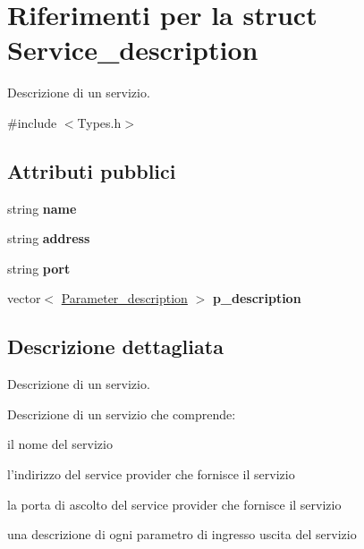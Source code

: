 \hypertarget{struct_service__description}{\section{Riferimenti per la struct Service\-\_\-description}
\label{struct_service__description}
}


Descrizione di un servizio.  




{\ttfamily \#include $<$Types.\-h$>$}

\subsection*{Attributi pubblici}
\begin{DoxyCompactItemize}
\item 
\hypertarget{struct_service__description_a6c61a7fe832b55eec7ec25db11cb6b5e}{string {\bfseries name}}\label{struct_service__description_a6c61a7fe832b55eec7ec25db11cb6b5e}

\item 
\hypertarget{struct_service__description_a20264f028c7feb764b4a010417422c81}{string {\bfseries address}}\label{struct_service__description_a20264f028c7feb764b4a010417422c81}

\item 
\hypertarget{struct_service__description_ad8c75edbd6d33704a05037774967cd96}{string {\bfseries port}}\label{struct_service__description_ad8c75edbd6d33704a05037774967cd96}

\item 
\hypertarget{struct_service__description_a0fdb676f354630feb1fc0535fff3a24d}{vector$<$ \hyperlink{struct_parameter__description}{Parameter\-\_\-description} $>$ {\bfseries p\-\_\-description}}\label{struct_service__description_a0fdb676f354630feb1fc0535fff3a24d}

\end{DoxyCompactItemize}


\subsection{Descrizione dettagliata}
Descrizione di un servizio. 

Descrizione di un servizio che comprende\-: \begin{DoxyItemize}
\item il nome del servizio \item l'indirizzo del service provider che fornisce il servizio \item la porta di ascolto del service provider che fornisce il servizio \item una descrizione di ogni parametro di ingresso uscita del servizio \end{DoxyItemize}


